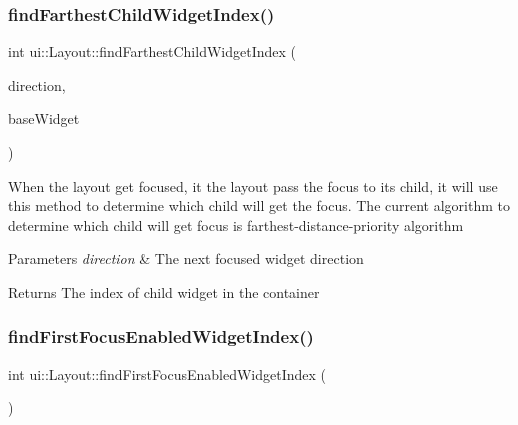 \subsubsection{\texorpdfstring{find\+Farthest\+Child\+Widget\+Index()}{findFarthestChildWidgetIndex()}\hspace{0.1cm}{\footnotesize\ttfamily [2/2]}}
{\footnotesize\ttfamily int ui\+::\+Layout\+::find\+Farthest\+Child\+Widget\+Index (\begin{DoxyParamCaption}\item[{\hyperlink{classui_1_1Widget_a8ae8e8fc793a04a87584205cd1e8a8a5}{Focus\+Direction}}]{direction,  }\item[{\hyperlink{classui_1_1Widget}{Widget} $\ast$}]{base\+Widget }\end{DoxyParamCaption})\hspace{0.3cm}{\ttfamily [protected]}}

When the layout get focused, it the layout pass the focus to its child, it will use this method to determine which child will get the focus. The current algorithm to determine which child will get focus is farthest-\/distance-\/priority algorithm 
\begin{DoxyParams}{Parameters}
{\em direction} & The next focused widget direction \\
\hline
\end{DoxyParams}
\begin{DoxyReturn}{Returns}
The index of child widget in the container 
\end{DoxyReturn}
\mbox{\label{classui_1_1Layout_a9a84f2518571e511862189f3c230b984}} 
\subsubsection{\texorpdfstring{find\+First\+Focus\+Enabled\+Widget\+Index()}{findFirstFocusEnabledWidgetIndex()}\hspace{0.1cm}{\footnotesize\ttfamily [1/2]}}
{\footnotesize\ttfamily int ui\+::\+Layout\+::find\+First\+Focus\+Enabled\+Widget\+Index (\begin{DoxyParamCaption}{ }\end{DoxyParamCaption})\hspace{0.3cm}{\ttfamily [protected]}}

